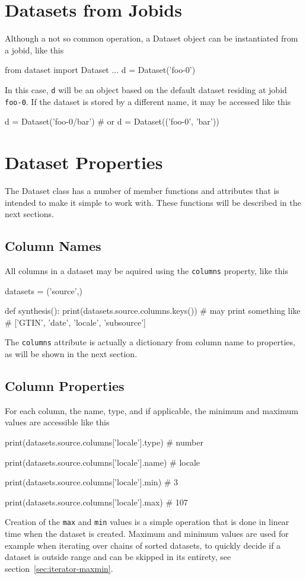 \section{Datasets from Jobids}
Although a not so common operation, a Dataset object can be
instantiated from a jobid, like this
\begin{python}
from dataset import Dataset
...
d = Dataset('foo-0')
\end{python}
In this case, \texttt{d} will be an object based on the default
dataset residing at jobid \texttt{foo-0}.  If the dataset is stored by
a different name, it may be accessed like this
\begin{python}
d = Dataset('foo-0/bar')
# or
d = Dataset(('foo-0', 'bar'))
\end{python}



                      



\clearpage
\section{Dataset Properties}
The Dataset class has a number of member functions and attributes that
is intended to make it simple to work with.  These functions will be
described in the next sections.


\subsection*{Column Names}
All columns in a dataset may be aquired using the \texttt{columns}
property, like this
\begin{python}
datasets = ('source',)

def synthesis():
  print(datasets.source.columns.keys())
  # may print something like
  # ['GTIN', 'date', 'locale', 'subsource']
\end{python}
The \texttt{columns} attribute is actually a dictionary from column
name to properties, as will be shown in the next section.


\subsection*{Column Properties}
For each column, the name, type, and if applicable, the minimum and
maximum values are accessible like this
\begin{python}
print(datasets.source.columns['locale'].type)
# number

print(datasets.source.columns['locale'].name)
# locale

print(datasets.source.columns['locale'].min)
# 3

print(datasets.source.columns['locale'].max)
# 107
\end{python}
Creation of the \texttt{max} and \texttt{min} values is a simple
operation that is done in linear time when the dataset is created.
Maximum and minimum values are used for example when iterating over
chains of sorted datasets, to quickly decide if a dataset is outside
range and can be skipped in its entirety, see
section~\ref{sec:iterator-maxmin}.


